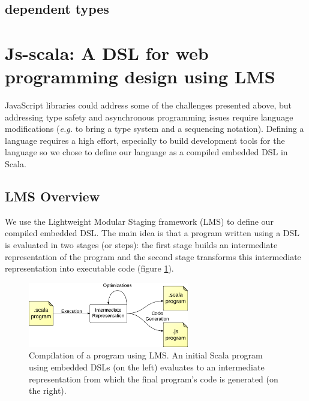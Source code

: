 \documentclass[runningheads,a4paper]{llncs}
\newcommand{\eg}{\emph{e.g.}}
\begin{document}
\subsection{dependent types}

\section{Js-scala: A DSL for web programming design using LMS}


JavaScript libraries could address some of the challenges presented above, but addressing type safety and
asynchronous programming issues require language modifications (\eg{} to bring a type system and a sequencing
notation). Defining a language requires a high effort, especially to build development tools for the language so we
chose to define our language as a compiled embedded DSL in Scala.


\subsection{LMS Overview}

We use the Lightweight Modular Staging framework (LMS) to define our compiled embedded DSL. The main idea is that a
program written using a DSL is evaluated in two stages (or steps): the first stage builds an intermediate
representation of the program and the second stage transforms this intermediate representation into executable code
(figure \ref{lms-diagram}).

\begin{figure}
  \centering
  \includegraphics[width=7cm]{lms.pdf}
  \caption{Compilation of a program using LMS. An initial Scala program using embedded DSLs (on the left) evaluates
  to an intermediate representation from which the final program’s code is generated (on the right).}
  \label{lms-diagram}
\end{figure}
\end{document}
